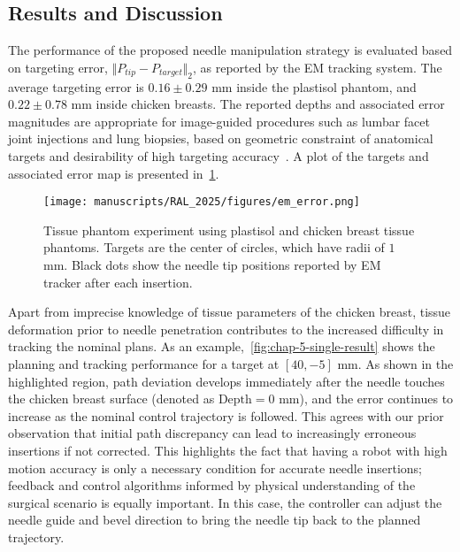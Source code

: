 \subsection{Results and Discussion}
\label{sec:chap-5-results-and-discussion}

The performance of the proposed needle manipulation strategy is evaluated based on targeting error, $\Vert P_{tip} - P_{target}\Vert_2$, as reported by the EM tracking system. The average targeting error is $0.16 \pm 0.29$ mm inside the plastisol phantom, and $0.22 \pm 0.78$ mm inside chicken breasts. The reported depths and associated error magnitudes are appropriate for image-guided procedures such as lumbar facet joint injections and lung biopsies, based on geometric constraint of anatomical targets and desirability of high targeting accuracy~\cite{simonVivoTopographicAnalysis2012, anzideiImagingGuidedChestBiopsies2017}. A plot of the targets and associated error map is presented in~\cref{fig:chap-5-em-error}.

\begin{figure}[h]
  \centering
  \texttt{[image: manuscripts/RAL\_2025/figures/em\_error.png]}
  \caption{Tissue phantom experiment using plastisol and chicken breast tissue phantoms. Targets are the center of circles, which have radii of $1$ mm. Black dots show the needle tip positions reported by EM tracker after each insertion.}
  \label{fig:chap-5-em-error}
\end{figure}

Apart from imprecise knowledge of tissue parameters of the chicken breast, tissue deformation prior to needle penetration contributes to the increased difficulty in tracking the nominal plans. As an example,~\cref{fig:chap-5-single-result} shows the planning and tracking performance for a target at $[40, -5]$ mm. As shown in the highlighted region, path deviation develops immediately after the needle touches the chicken breast surface (denoted as $\text{Depth}=0$ mm), and the error continues to increase as the nominal control trajectory is followed. This agrees with our prior observation that initial path discrepancy can lead to increasingly erroneous insertions if not corrected. This highlights the fact that having a robot with high motion accuracy is only a necessary condition for accurate needle insertions; feedback and control algorithms informed by physical understanding of the surgical scenario is equally important. In this case, the controller can adjust the needle guide and bevel direction to bring the needle tip back to the planned trajectory.

